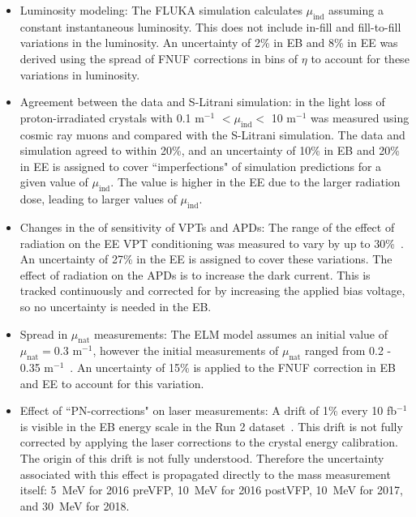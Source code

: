 \begin{itemize}
\item Luminosity modeling: The FLUKA simulation calculates $\mu_{\mathrm{ind}}$ assuming a constant instantaneous luminosity. This does not include in-fill and fill-to-fill variations in the luminosity. An uncertainty of 2\% in EB and 8\% in EE was derived using the spread of FNUF corrections in bins of $\eta$ to account for these variations in luminosity.

\item Agreement between the data and S-Litrani simulation: in \cite{NIM-A-564-2006} the light loss of proton-irradiated crystals with 0.1 m$^{-1}$ $< \mu_{\mathrm{ind}} < $ 10 m$^{-1}$ was measured using cosmic ray muons and compared with the S-Litrani simulation. The data and simulation agreed to within 20\%, and an uncertainty of 10\% in EB and 20\% in EE is assigned to cover ``imperfections" of simulation predictions for a given value of $\mu_{\mathrm{ind}}$. The value is higher in the EE due to the larger radiation dose, leading to larger values of $\mu_{\mathrm{ind}}$.

\item Changes in the of sensitivity of VPTs and APDs: The range of the effect of radiation on the EE VPT conditioning was measured to vary by up to 30\%~\cite{VPT-conditioning}. An uncertainty of 27\% in the EE is assigned to cover these variations. The effect of radiation on the APDs is to increase the dark current. This is tracked continuously and corrected for by increasing the applied bias voltage, so no uncertainty is needed in the EB. 

\item Spread in $\mu_{\mathrm{nat}}$ measurements: The ELM model assumes an initial value of $\mu_{\mathrm{nat}} = 0.3$ m$^{-1}$, however the initial measurements of $\mu_{\mathrm{nat}}$ ranged from 0.2 - 0.35 m$^{-1}$~\cite{mu_natural}. An uncertainty of 15\% is applied to the FNUF correction in EB and EE to account for this variation.   

\item Effect of ``PN-corrections" on laser measurements: A drift of 1\% every 10 fb$^{-1}$ is visible in the EB energy scale in the Run 2 dataset~\cite{CMS:ECALRun2}. This drift is not fully corrected by applying the laser corrections to the crystal energy calibration. The origin of this drift is not fully understood. Therefore the uncertainty associated with this effect is propagated directly to the mass measurement itself: 5~MeV for 2016 preVFP, 10~MeV for 2016 postVFP, 10~MeV for 2017, and 30~MeV for 2018.      
\end{itemize}

